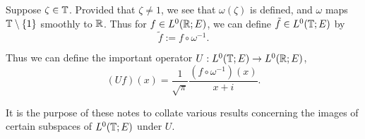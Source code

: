 Suppose $\zeta \in \mathbb{T}$. Provided that $\zeta \neq 1$, we see that $\omega(\zeta)$
is defined, and $\omega$ maps $\mathbb{T}\setminus\{1\}$ smoothly to $\mathbb{R}$. Thus for
$f \in L^0(\mathbb{R};E)$, we can define $\tilde{f} \in L^0(\mathbb{T};E)$
by 
\begin{equation*}
    \tilde{f} := f\circ \omega^{-1}.
\end{equation*}

Thus we can define the important operator $U:L^0(\mathbb{T};E)\rightarrow L^0(\mathbb{R};E)$,
\begin{equation*}
    (U f)(x) = \frac{1}{\sqrt{\pi}}\frac{(f\circ \omega^{-1})(x)}{x+i}.
\end{equation*}

It is the purpose of these notes to collate various results concerning the images
of certain subspaces of $L^0(\mathbb{T};E)$ under $U$.

